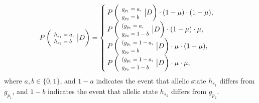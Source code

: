 \documentclass{bioinfo}
\newcommand*{\Scale}[2][4]{\scalebox{#1}{$#2$}}%
\begin{document}
\begin{equation}
P\left(\Scale[0.8]{ \begin{array}{l} h_{s_1} = a, \\h_{s_2} = b \end{array}}\big{|} D\right) =
\begin{cases}
P\left(\Scale[0.8]{ \begin{array}{l} g_{p_1} = a, \\g_{p_2} = b \end{array}} \big{|} D\right) \cdot (1-\mu) \cdot (1-\mu), \\%
P\left(\Scale[0.8]{ \begin{array}{l}(g_{p_1} = a, \\g_{p_2} = 1-b \end{array}}\big{|} D\right) \cdot (1 - \mu) \cdot \mu, \\%
P\left(\Scale[0.8]{ \begin{array}{l}(g_{p_1} = 1-a, \\g_{p_2} = b \end{array}}\big{|} D\right) \cdot \mu \cdot (1 - \mu), \\%
P\left(\Scale[0.8]{ \begin{array}{l}(g_{p_1} = 1-a, \\g_{p_2} = 1-b \end{array}}\big{|} D\right) \cdot \mu \cdot \mu, \\%
\end{cases}
\label{eqn:ps0_pair}
\end{equation}
where $a,b \in \{0, 1\}$, and $1-a$ indicates the event that allelic state $h_{s_1}$ differs from $g_{p_1}$, and $1-b$ indicates the event that allelic state $h_{s_2}$ differs from $g_{p_2}$.
\end{document}
